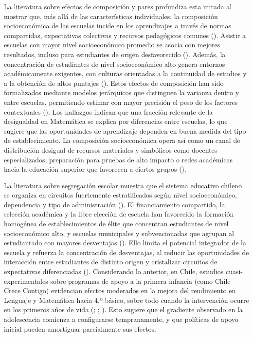 \documentclass[
  spanish,
  a4paper,
  oneside]{scrbook}
\begin{document}
La literatura sobre efectos de composición y pares profundiza esta
mirada al mostrar que, más allá de las características individuales, la
composición socioeconómica de las escuelas incide en los aprendizajes a
través de normas compartidas, expectativas colectivas y recursos
pedagógicos comunes (). Asistir a
escuelas con mayor nivel socioeconómico promedio se asocia con mejores
resultados, incluso para estudiantes de origen desfavorecido
(). Además, la concentración de
estudiantes de nivel socioeconómico alto genera entornos académicamente
exigentes, con culturas orientadas a la continuidad de estudios y a la
obtención de altos puntajes ().
Estos efectos de composición han sido formalizados mediante modelos
jerárquicos que distinguen la varianza dentro y entre escuelas,
permitiendo estimar con mayor precisión el peso de los factores
contextuales (). Los hallazgos indican que una fracción relevante de la
desigualdad en Matemática se explica por diferencias entre escuelas, lo
que sugiere que las oportunidades de aprendizaje dependen en buena
medida del tipo de establecimiento. La composición socioeconómica opera
así como un canal de distribución desigual de recursos materiales y
simbólicos como docentes especializados, preparación para pruebas de
alto impacto o redes académicas hacia la educación superior que
favorecen a ciertos grupos ().

La literatura sobre segregación escolar muestra que el sistema educativo
chileno se organiza en circuitos fuertemente estratificados según nivel
socioeconómico, dependencia y tipo de administración
().
El financiamiento compartido, la selección académica y la libre elección
de escuela han favorecido la formación homogénea de establecimientos de
élite que concentran estudiantes de nivel socioeconómico alto, y
escuelas municipales y subvencionadas que agrupan al estudiantado con
mayores desventajas (). Ello
limita el potencial integrador de la escuela y refuerza la concentración
de desventajas, al reducir las oportunidades de interacción entre
estudiantes de distinto origen y cristalizar circuitos de expectativas
diferenciadas ().
Considerando lo anterior, en Chile, estudios cuasi-experimentales sobre
programas de apoyo a la primera infancia (como Chile Crece Contigo)
evidencian efectos moderados en la mejora del rendimiento en Lenguaje y
Matemática hacia 4.º básico, sobre todo cuando la intervención ocurre en
los primeros años de vida (; ;
). Esto
sugiere que el gradiente observado en la adolescencia comienza a
configurarse tempranamente, y que políticas de apoyo inicial pueden
amortiguar parcialmente sus efectos.
\end{document}
